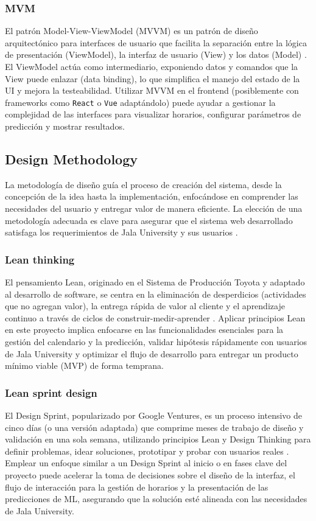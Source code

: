 \subsubsection{MVM}
El patrón Model-View-ViewModel (MVVM) es un patrón de diseño arquitectónico para interfaces de usuario que facilita la separación entre la lógica de presentación (ViewModel), la interfaz de usuario (View) y los datos (Model) \parencite{Smith2005}. El ViewModel actúa como intermediario, exponiendo datos y comandos que la View puede enlazar (data binding), lo que simplifica el manejo del estado de la UI y mejora la testeabilidad. Utilizar MVVM en el frontend (posiblemente con frameworks como \texttt{React} o \texttt{Vue} adaptándolo) puede ayudar a gestionar la complejidad de las interfaces para visualizar horarios, configurar parámetros de predicción y mostrar resultados.

\subsection{Design Methodology}
La metodología de diseño guía el proceso de creación del sistema, desde la concepción de la idea hasta la implementación, enfocándose en comprender las necesidades del usuario y entregar valor de manera eficiente. La elección de una metodología adecuada es clave para asegurar que el sistema web desarrollado satisfaga los requerimientos de Jala University y sus usuarios \parencite{Cooper2014}.

\subsubsection{Lean thinking}
El pensamiento Lean, originado en el Sistema de Producción Toyota y adaptado al desarrollo de software, se centra en la eliminación de desperdicios (actividades que no agregan valor), la entrega rápida de valor al cliente y el aprendizaje continuo a través de ciclos de construir-medir-aprender \parencite{WomackJones2003}. Aplicar principios Lean en este proyecto implica enfocarse en las funcionalidades esenciales para la gestión del calendario y la predicción, validar hipótesis rápidamente con usuarios de Jala University y optimizar el flujo de desarrollo para entregar un producto mínimo viable (MVP) de forma temprana.

\subsubsection{Lean sprint design}
El Design Sprint, popularizado por Google Ventures, es un proceso intensivo de cinco días (o una versión adaptada) que comprime meses de trabajo de diseño y validación en una sola semana, utilizando principios Lean y Design Thinking para definir problemas, idear soluciones, prototipar y probar con usuarios reales \parencite{Knapp2016}. Emplear un enfoque similar a un Design Sprint al inicio o en fases clave del proyecto puede acelerar la toma de decisiones sobre el diseño de la interfaz, el flujo de interacción para la gestión de horarios y la presentación de las predicciones de ML, asegurando que la solución esté alineada con las necesidades de Jala University.

